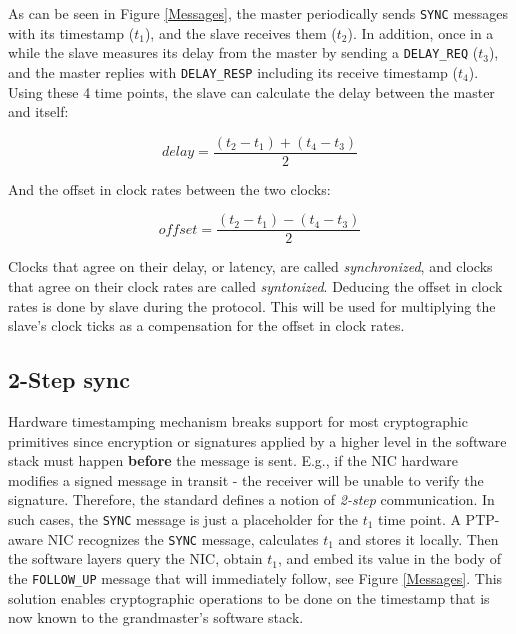 \documentclass[11pt]{article}
\begin{document}
As can be seen in Figure \ref{Messages}, the master periodically sends \texttt{SYNC} messages with its timestamp ($t_1$), and the slave receives them ($t_2$). In addition, once in a while the slave measures its delay from the master by sending a \texttt{DELAY_REQ} ($t_3$), and the master replies with \texttt{DELAY_RESP} including its receive timestamp ($t_4$). Using these 4 time points, the slave can calculate the delay between the master and itself:

\begin{equation}
  delay = \frac{(t_2 - t_1) + (t_4 - t_3)}{2}
\end{equation}

And the offset in clock rates between the two clocks:

\begin{equation}
  offset = \frac{(t_2 - t_1) - (t_4 - t_3)}{2}
\end{equation}

Clocks that agree on their delay, or latency, are called \emph{synchronized}, and clocks that agree on their clock rates are called \emph{syntonized}. Deducing the offset in clock rates is done by slave during the protocol. This will be used for multiplying the slave's clock ticks as a compensation for the offset in clock rates.



\subsection{2-Step sync}\label{2step}

Hardware timestamping mechanism breaks support for most cryptographic primitives since encryption or signatures applied by a higher level in the software stack must happen \textbf{before} the message is sent. E.g., if the NIC hardware modifies a signed message in transit - the receiver will be unable to verify the signature. Therefore, the standard defines a notion of \emph{2-step} communication. In such cases, the \texttt{SYNC} message is just a placeholder for the $t_1$ time point. A PTP-aware NIC recognizes the \texttt{SYNC} message, calculates $t_1$ and stores it locally. Then the software layers query the NIC, obtain $t_1$, and embed its value in the body of the \texttt{FOLLOW_UP} message that will immediately follow, see Figure \ref{Messages}. This solution enables cryptographic operations to be done on the timestamp that is now known to the grandmaster's software stack.
\end{document}
